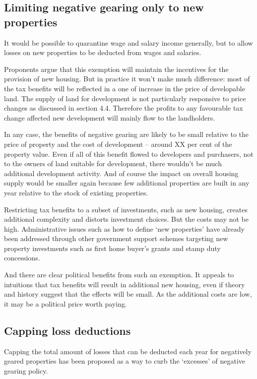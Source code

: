 \documentclass{grattan}\usepackage[]{graphicx}\usepackage[]{color}
\begin{document}
\subsection{Limiting negative gearing only to new properties}
It would be possible to quarantine wage and salary income generally, but to allow losses on new properties to be deducted from wages and salaries. 

Proponents argue that this exemption will maintain the incentives for the provision of new housing.  But in practice it won't make much difference: most of the tax benefits will be reflected in a one of increase in the price of developable land. The supply of land for development is not particularly responsive to price changes as discussed in section 4.4. Therefore the profits to any favourable tax change affected new development will mainly flow to the landholders. 



In any case, the benefits of negative gearing are likely to be small relative to the price of property and the cost of development -- around XX per cent of the property value.  Even if all of this benefit flowed to developers and purchasers, not to the owners of land suitable for development, there wouldn't be much additional development activity. And of course the impact on overall housing supply would be smaller again because few additional properties are built in any year relative to the stock of existing properties. 

Restricting tax benefits to a subset of investments, such as new housing, creates additional complexity and distorts investment choices. But the costs may not be high. Administrative issues such as how to define `new properties' have already been addressed through  other government support schemes targeting new property investments such as first home buyer's grants and stamp duty concessions. 

And there are clear political benefits from such an exemption.  It appeals to intuitions that tax benefits will result in additional new housing, even if theory and history suggest that the effects will be small.  As the additional costs are low, it may be a political price worth paying.

\subsection{Capping loss deductions}
Capping the total amount of losses that can be deducted each year for negatively geared properties has been proposed as a way to curb the `excesses' of negative gearing policy. 
\end{document}
